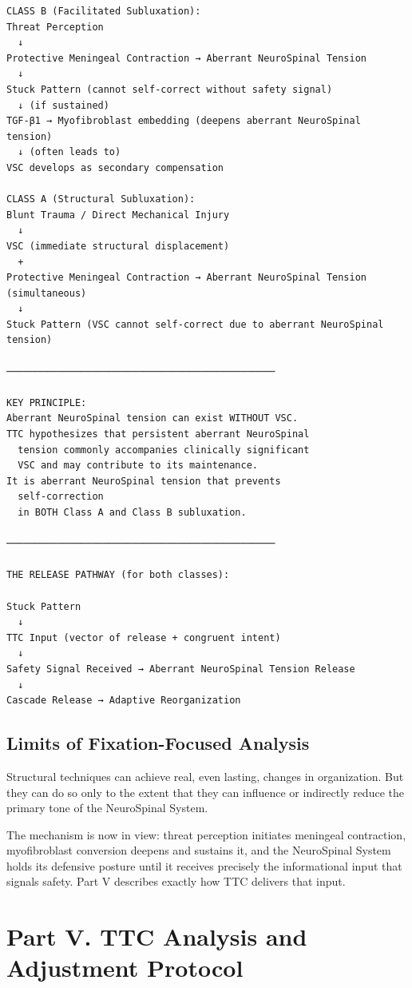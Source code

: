 \documentclass[11pt,letterpaper]{article}
\begin{document}
\begin{verbatim}
CLASS B (Facilitated Subluxation):
Threat Perception
  ↓
Protective Meningeal Contraction → Aberrant NeuroSpinal Tension
  ↓
Stuck Pattern (cannot self-correct without safety signal)
  ↓ (if sustained)
TGF-β1 → Myofibroblast embedding (deepens aberrant NeuroSpinal tension)
  ↓ (often leads to)
VSC develops as secondary compensation

CLASS A (Structural Subluxation):
Blunt Trauma / Direct Mechanical Injury
  ↓
VSC (immediate structural displacement)
  +
Protective Meningeal Contraction → Aberrant NeuroSpinal Tension (simultaneous)
  ↓
Stuck Pattern (VSC cannot self-correct due to aberrant NeuroSpinal tension)

───────────────────────────────────────────────

KEY PRINCIPLE:
Aberrant NeuroSpinal tension can exist WITHOUT VSC.
TTC hypothesizes that persistent aberrant NeuroSpinal
  tension commonly accompanies clinically significant
  VSC and may contribute to its maintenance.
It is aberrant NeuroSpinal tension that prevents
  self-correction
  in BOTH Class A and Class B subluxation.

───────────────────────────────────────────────

THE RELEASE PATHWAY (for both classes):

Stuck Pattern
  ↓
TTC Input (vector of release + congruent intent)
  ↓
Safety Signal Received → Aberrant NeuroSpinal Tension Release
  ↓
Cascade Release → Adaptive Reorganization
\end{verbatim}


\subsection{Limits of Fixation-Focused Analysis}

Structural techniques can achieve real, even lasting, changes in organization. But they can do so only to the extent that they can influence or indirectly reduce the primary tone of the NeuroSpinal System.


The mechanism is now in view: threat perception initiates meningeal contraction, myofibroblast conversion deepens and sustains it, and the NeuroSpinal System holds its defensive posture until it receives precisely the informational input that signals safety. Part V describes exactly how TTC delivers that input.


\section{Part V. TTC Analysis and Adjustment Protocol}
\end{document}
